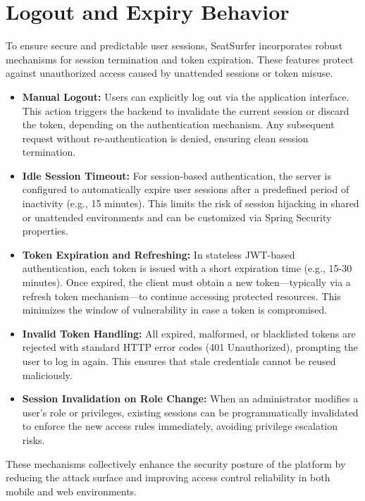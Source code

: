 \documentclass[12pt,a4paper]{report}
\begin{document}
\section{Logout and Expiry Behavior}

To ensure secure and predictable user sessions, SeatSurfer incorporates robust mechanisms for session termination and token expiration. These features protect against unauthorized access caused by unattended sessions or token misuse.

\begin{itemize}
\item \textbf{Manual Logout:}
Users can explicitly log out via the application interface. This action triggers the backend to invalidate the current session or discard the token, depending on the authentication mechanism. Any subsequent request without re-authentication is denied, ensuring clean session termination.
\item \textbf{Idle Session Timeout:}  
For session-based authentication, the server is configured to automatically expire user sessions after a predefined period of inactivity (e.g., 15 minutes). This limits the risk of session hijacking in shared or unattended environments and can be customized via Spring Security properties.

\item \textbf{Token Expiration and Refreshing:}  
In stateless JWT-based authentication, each token is issued with a short expiration time (e.g., 15-30 minutes). Once expired, the client must obtain a new token—typically via a refresh token mechanism—to continue accessing protected resources. This minimizes the window of vulnerability in case a token is compromised.

\item \textbf{Invalid Token Handling:}  
All expired, malformed, or blacklisted tokens are rejected with standard HTTP error codes (401 Unauthorized), prompting the user to log in again. This ensures that stale credentials cannot be reused maliciously.

\item \textbf{Session Invalidation on Role Change:}  
When an administrator modifies a user’s role or privileges, existing sessions can be programmatically invalidated to enforce the new access rules immediately, avoiding privilege escalation risks.
\end{itemize}

These mechanisms collectively enhance the security posture of the platform by reducing the attack surface and improving access control reliability in both mobile and web environments.
\end{document}
